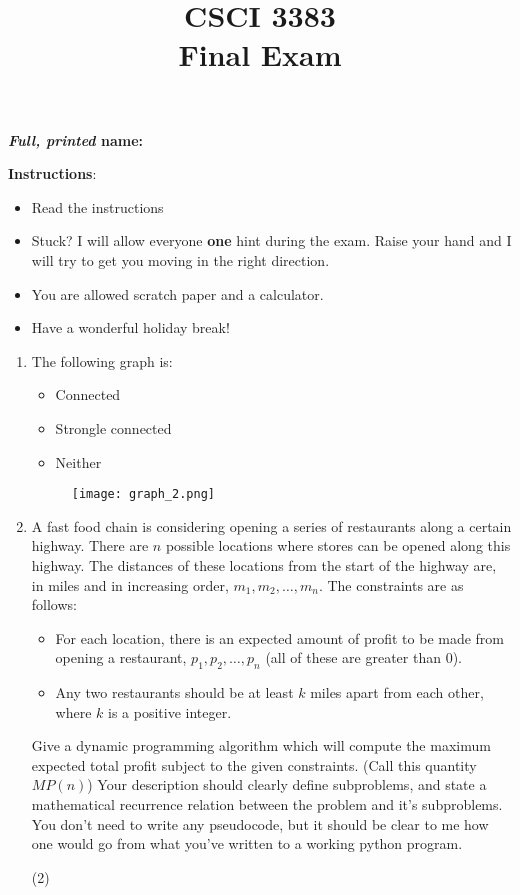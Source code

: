 \documentclass[12pt]{article}
\title{CSCI 3383 \\Final Exam}
\date{}
\begin{document}
\maketitle
\textbf{\emph{Full, printed} name: }
\vspace{1cm}

\textbf{Instructions}: 
\begin{itemize}
    \item Read the instructions
    \item Stuck? I will allow everyone \textbf{one} hint during the exam. Raise your hand and I will try to get you moving in the right direction.  
    \item You are allowed scratch paper and a calculator. 
    \item Have a wonderful holiday break!
\end{itemize} 


\newpage
\begin{enumerate}
    \item The following graph is:
    \begin{itemize}
        \item Connected
        \item Strongle connected
        \item Neither
    \end{itemize}
    \begin{figure}[h]
        \centering
        \texttt{[image: graph\_2.png]}
    \end{figure}
    \item A fast food chain is considering opening a series of restaurants along a certain highway. There are $n$ possible locations where stores can be opened along this highway. The distances of these locations from the start of the highway are, in miles and in increasing order, $m_1, m_2, \ldots, m_n$. The constraints are as follows:
    \begin{itemize}
        \item For each location, there is an expected amount of profit to be made from opening a restaurant, $p_1, p_2, \ldots, p_n$ (all of these are greater than $0$).
        \item Any two restaurants should be at least $k$ miles apart from each other, where $k$ is a positive integer. 
    \end{itemize} 
    Give a dynamic programming algorithm which will compute the maximum expected total profit subject to the given constraints. (Call this quantity $MP(n)$) Your description should clearly define subproblems, and state a mathematical recurrence relation between the problem and it's subproblems. You don't need to write any pseudocode, but it should be clear to me how one would go from what you've written to a working python program. 

    \item[(2)] 
\end{enumerate}
\end{document}
